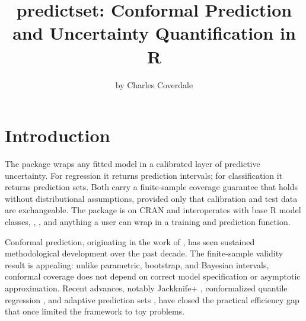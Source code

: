 \title{predictset: Conformal Prediction and Uncertainty Quantification in R}


\author{by Charles Coverdale}

\maketitle


\section{Introduction}\label{introduction}

The  package wraps any fitted model in a calibrated layer
of predictive uncertainty. For regression it returns prediction intervals; for
classification it returns prediction sets. Both carry a finite-sample coverage
guarantee that holds without distributional assumptions, provided only that
calibration and test data are exchangeable. The package is on CRAN and
interoperates with base R model classes, , , and
anything a user can wrap in a training and prediction function.

Conformal prediction, originating in the work of \citet{vovk2005algorithmic}, has
seen sustained methodological development over the past decade. The
finite-sample validity result is appealing: unlike parametric, bootstrap, and
Bayesian intervals, conformal coverage does not depend on correct model
specification or asymptotic approximation. Recent advances, notably
Jackknife+ \citep{barber2021predictive}, conformalized quantile regression
\citep{romano2019conformalized}, and adaptive prediction sets
\citep{romano2020classification}, have closed the practical efficiency gap that
once limited the framework to toy problems.

